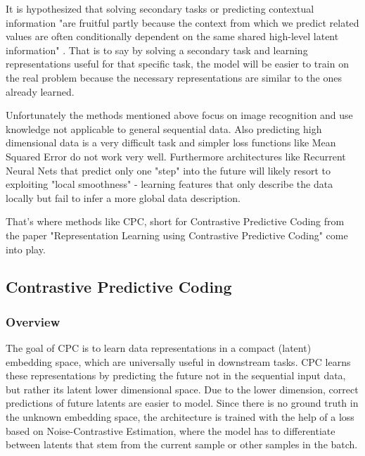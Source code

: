 It is hypothesized that solving secondary tasks or predicting contextual information "are fruitful partly because the context from which we predict related values are often conditionally dependent on the same shared high-level latent information" \autocite{DBLP:journals/corr/abs-1807-03748}. That is to say by solving a secondary task and learning representations useful for that specific task, the model will be easier to train on the real problem because the necessary representations are similar to the ones already learned.

Unfortunately the methods mentioned above focus on image recognition and use knowledge not applicable to general sequential data. Also predicting high dimensional data is a very difficult task and simpler loss functions like Mean Squared Error do not work very well. Furthermore architectures like Recurrent Neural Nets that predict only one "step" into the future will likely resort to exploiting "local smoothness" - learning features that only describe the data locally but fail to infer a more global data description.

That's where methods like CPC, short for Contrastive Predictive Coding from the paper "Representation Learning using Contrastive Predictive Coding"\autocite{DBLP:journals/corr/abs-1807-03748} come into play. 

\subsection{Contrastive Predictive Coding}
\subsubsection{Overview}
\label{section:cpcindetail}
The goal of CPC is to learn data representations in a compact (latent) embedding space, which are universally useful in downstream tasks. CPC learns these representations by predicting the future not in the sequential input data, but rather its latent lower dimensional space. Due to the lower dimension, correct predictions of future latents are easier to model. Since there is no ground truth in the unknown embedding space, the architecture is trained with the help of a loss based on Noise-Contrastive Estimation, where the model has to differentiate between latents that stem from the current sample or other samples in the batch.

